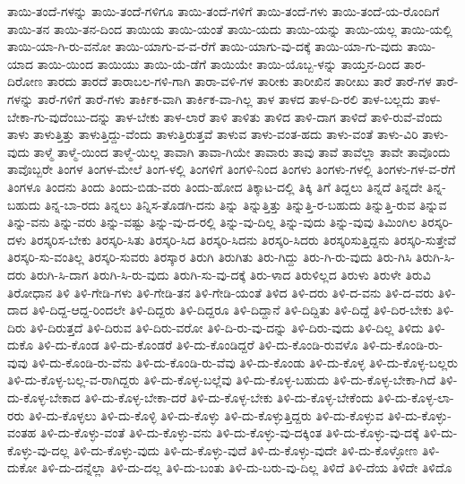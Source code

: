 {ತಾಯಿ-ತಂದೆ-ಗಳನ್ನು
ತಾಯಿ-ತಂದೆ-ಗಳಿಗೂ
ತಾಯಿ-ತಂದೆ-ಗಳಿಗೆ
ತಾಯಿ-ತಂದೆ-ಗಳು
ತಾಯಿ-ತಂದೆ-ಯ-ರೊಂದಿಗೆ
ತಾಯಿ-ತನ
ತಾಯಿ-ತನ-ದಿಂದ
ತಾಯಿಯ
ತಾಯಿ-ಯಂತೆ
ತಾಯಿ-ಯದು
ತಾಯಿ-ಯನ್ನು
ತಾಯಿ-ಯಲ್ಲ
ತಾಯಿ-ಯಲ್ಲಿ
ತಾಯಿ-ಯಾ-ಗಿ-ರು-ವನೋ
ತಾಯಿ-ಯಾಗು-ವ-ವ-ರೆಗೆ
ತಾಯಿ-ಯಾಗು-ವು-ದಕ್ಕೆ
ತಾಯಿ-ಯಾ-ಗು-ವುದು
ತಾಯಿ-ಯಾದ
ತಾಯಿ-ಯಿಂದ
ತಾಯಿಯು
ತಾಯಿ-ಯೆ-ಡೆಗೆ
ತಾಯಿಯೇ
ತಾಯಿ-ಯೊಬ್ಬ-ಳನ್ನು
ತಾಯ್ತನ-ದಿಂದ
ತಾರ-ದಿರೋಣ
ತಾರದು
ತಾರದೆ
ತಾರಾಬಲ-ಗಳಿ-ಗಾಗಿ
ತಾರಾ-ವಳಿ-ಗಳ
ತಾರೀಕು
ತಾರೀಖಿನ
ತಾರೀಖು
ತಾರೆ
ತಾರೆ-ಗಳ
ತಾರೆ-ಗಳನ್ನು
ತಾರೆ-ಗಳಿಗೆ
ತಾರೆ-ಗಳು
ತಾರ್ಕಿಕ-ವಾಗಿ
ತಾರ್ಕಿಕ-ವಾ-ಗಿಲ್ಲ
ತಾಳ
ತಾಳದ
ತಾಳ-ದಿ-ರಲಿ
ತಾಳ-ಬಲ್ಲದು
ತಾಳ-ಬೇಕಾ-ಗು-ವುದೆಂಬು-ದನ್ನು
ತಾಳ-ಬೇಕು
ತಾಳ-ಲಾರೆ
ತಾಳಿ
ತಾಳಿತು
ತಾಳಿದ
ತಾಳಿ-ದಾಗ
ತಾಳಿದೆ
ತಾಳಿ-ರುವೆ-ವೆಂದು
ತಾಳು
ತಾಳುತ್ತಿತ್ತು
ತಾಳುತ್ತಿದ್ದು-ವೆಂದು
ತಾಳುತ್ತಿರುತ್ತವೆ
ತಾಳುವ
ತಾಳು-ವಂತ-ಹದು
ತಾಳು-ವಂತೆ
ತಾಳು-ವಿರಿ
ತಾಳು-ವುದು
ತಾಳ್ಮೆ
ತಾಳ್ಮೆ-ಯಿಂದ
ತಾಳ್ಮೆ-ಯಿಲ್ಲ
ತಾವಾಗಿ
ತಾವಾ-ಗಿಯೇ
ತಾವಾರು
ತಾವು
ತಾವೆ
ತಾವೆಲ್ಲಾ
ತಾವೇ
ತಾವೊಂದು
ತಾವೊಬ್ಬರೇ
ತಿಂಗಳ
ತಿಂಗಳ-ಮೇಲೆ
ತಿಂಗ-ಳಲ್ಲಿ
ತಿಂಗಳಿಗೆ
ತಿಂಗಳಿ-ನಿಂದ
ತಿಂಗಳು
ತಿಂಗಳು-ಗಳಲ್ಲಿ
ತಿಂಗಳು-ಗಳ-ವ-ರೆಗೆ
ತಿಂಗಳೂ
ತಿಂದನು
ತಿಂದು
ತಿಂದು-ಬಿಡು-ವರು
ತಿಂದು-ಹೋದ
ತಿಕ್ಕಾಟ-ದಲ್ಲಿ
ತಿಕ್ಕಿ
ತಿಗೆ
ತಿದ್ದಲು
ತಿನ್ನದೆ
ತಿನ್ನದೇ
ತಿನ್ನ-ಬಹುದು
ತಿನ್ನ-ಬಾ-ರದು
ತಿನ್ನಲು
ತಿನ್ನಿಸ-ತೊಡಗಿ-ದನು
ತಿನ್ನು
ತಿನ್ನುತ್ತಿತ್ತು
ತಿನ್ನುತ್ತಿ-ರ-ಬಹುದು
ತಿನ್ನುತ್ತಿ-ರುವ
ತಿನ್ನುವ
ತಿನ್ನು-ವನು
ತಿನ್ನು-ವರು
ತಿನ್ನು-ವಷ್ಟು
ತಿನ್ನು-ವು-ದ-ರಲ್ಲಿ
ತಿನ್ನು-ವು-ದಿಲ್ಲ
ತಿನ್ನು-ವುದು
ತಿನ್ನು-ವುವು
ತಿಮಿಂಗಿಲ
ತಿರಸ್ಕರಿ-ದಳು
ತಿರಸ್ಕರಿಸ-ಬೇಕು
ತಿರಸ್ಕರಿ-ಸಿತು
ತಿರಸ್ಕರಿ-ಸಿದ
ತಿರಸ್ಕರಿ-ಸಿದನು
ತಿರಸ್ಕರಿ-ಸಿದರು
ತಿರಸ್ಕರಿಸುತ್ತಿದ್ದನು
ತಿರಸ್ಕರಿ-ಸುತ್ತೇವೆ
ತಿರಸ್ಕರಿ-ಸು-ವಂತಿಲ್ಲ
ತಿರಸ್ಕರಿ-ಸುವರು
ತಿರಸ್ಕಾರ
ತಿರುಗಿ
ತಿರುಗಿತು
ತಿರು-ಗಿದ್ದು
ತಿರು-ಗಿ-ರು-ವುದು
ತಿರು-ಗಿಸಿ
ತಿರುಗಿ-ಸಿ-ದರು
ತಿರುಗಿ-ಸಿ-ದಾಗ
ತಿರುಗಿ-ಸಿ-ರು-ವುದು
ತಿರುಗಿ-ಸು-ವು-ದಕ್ಕೆ
ತಿರು-ಳಾದ
ತಿರುಳಿಲ್ಲದ
ತಿರುಳು
ತಿರುಳೇ
ತಿರುವಿ
ತಿರೋಧಾನ
ತಿಳಿ
ತಿಳಿ-ಗೇಡಿ-ಗಳು
ತಿಳಿ-ಗೇಡಿ-ತನ
ತಿಳಿ-ಗೇಡಿ-ಯಂತೆ
ತಿಳಿದ
ತಿಳಿ-ದರು
ತಿಳಿ-ದ-ವನು
ತಿಳಿ-ದ-ವರು
ತಿಳಿ-ದಾದ
ತಿಳಿ-ದಿದ್ದ-ಆದ್ದ-ರಿಂದಲೇ
ತಿಳಿ-ದಿದ್ದರು
ತಿಳಿ-ದಿದ್ದರೂ
ತಿಳಿ-ದಿದ್ದಾನೆ
ತಿಳಿ-ದಿದ್ದಿತು
ತಿಳಿ-ದಿದ್ದೆ
ತಿಳಿ-ದಿರ-ಬೇಕು
ತಿಳಿ-ದಿರು
ತಿಳಿ-ದಿರುತ್ತದೆ
ತಿಳಿ-ದಿರುವ
ತಿಳಿ-ದಿರು-ವರೋ
ತಿಳಿ-ದಿ-ರು-ವು-ದನ್ನು
ತಿಳಿ-ದಿರು-ವುದು
ತಿಳಿ-ದಿಲ್ಲ
ತಿಳಿದು
ತಿಳಿ-ದುಕೊ
ತಿಳಿ-ದು-ಕೊಂಡ
ತಿಳಿ-ದು-ಕೊಂಡರೆ
ತಿಳಿ-ದು-ಕೊಂಡಿದ್ದರೆ
ತಿಳಿ-ದು-ಕೊಂಡಿ-ರುವಳೊ
ತಿಳಿ-ದು-ಕೊಂಡಿ-ರು-ವುವು
ತಿಳಿ-ದು-ಕೊಂಡಿ-ರು-ವೆನು
ತಿಳಿ-ದು-ಕೊಂಡಿ-ರು-ವೆವು
ತಿಳಿ-ದು-ಕೊಂಡು
ತಿಳಿ-ದು-ಕೊಳ್ಳ
ತಿಳಿ-ದು-ಕೊಳ್ಳ-ಬಲ್ಲರು
ತಿಳಿ-ದು-ಕೊಳ್ಳ-ಬಲ್ಲ-ವ-ರಾಗಿದ್ದರು
ತಿಳಿ-ದು-ಕೊಳ್ಳ-ಬಲ್ಲೆವು
ತಿಳಿ-ದು-ಕೊಳ್ಳ-ಬಹುದು
ತಿಳಿ-ದು-ಕೊಳ್ಳ-ಬೇಕಾ-ಗಿದೆ
ತಿಳಿ-ದು-ಕೊಳ್ಳ-ಬೇಕಾದ
ತಿಳಿ-ದು-ಕೊಳ್ಳ-ಬೇಕಾ-ದರೆ
ತಿಳಿ-ದು-ಕೊಳ್ಳ-ಬೇಕು
ತಿಳಿ-ದು-ಕೊಳ್ಳ-ಬೇಕೆಂದು
ತಿಳಿ-ದು-ಕೊಳ್ಳ-ಲಾ-ರರು
ತಿಳಿ-ದು-ಕೊಳ್ಳಲು
ತಿಳಿ-ದು-ಕೊಳ್ಳಿ
ತಿಳಿ-ದು-ಕೊಳ್ಳು
ತಿಳಿ-ದು-ಕೊಳ್ಳುತ್ತಿದ್ದರು
ತಿಳಿ-ದು-ಕೊಳ್ಳುವ
ತಿಳಿ-ದು-ಕೊಳ್ಳು-ವಂತಹ
ತಿಳಿ-ದು-ಕೊಳ್ಳು-ವಂತೆ
ತಿಳಿ-ದು-ಕೊಳ್ಳು-ವನು
ತಿಳಿ-ದು-ಕೊಳ್ಳು-ವು-ದಕ್ಕಿಂತ
ತಿಳಿ-ದು-ಕೊಳ್ಳು-ವು-ದಕ್ಕೆ
ತಿಳಿ-ದು-ಕೊಳ್ಳು-ವು-ದಲ್ಲ
ತಿಳಿ-ದು-ಕೊಳ್ಳು-ವುದು
ತಿಳಿ-ದು-ಕೊಳ್ಳು-ವುದೆ
ತಿಳಿ-ದು-ಕೊಳ್ಳು-ವುದೇ
ತಿಳಿ-ದು-ಕೊಳ್ಳೋಣ
ತಿಳಿ-ದುಕೋ
ತಿಳಿ-ದು-ದನ್ನೆಲ್ಲಾ
ತಿಳಿ-ದು-ದಲ್ಲ
ತಿಳಿ-ದು-ಬಂತು
ತಿಳಿ-ದು-ಬರು-ವು-ದಿಲ್ಲ
ತಿಳಿದೆ
ತಿಳಿ-ದೆಯ
ತಿಳಿದೇ
ತಿಳಿದೊ
}
